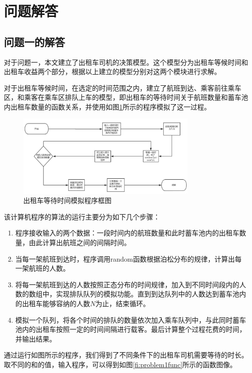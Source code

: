 \documentclass{cumcm}
\begin{document}
\section{问题解答}
\subsection{问题一的解答}
对于问题一，本文建立了出租车司机的决策模型。这个模型分为出租车等候时间和出租车收益两个部分，根据以上建立的模型分别对这两个模块进行求解。\par
对于出租车等候时间，在选定的时间范围之内，建立了航班到达、乘客前往乘车区，和乘客在乘车区排队上车的模型，即出租车的等待时间\waittime 关于航班数量\flightnum 和蓄车池内出租车数量\taxinum 的函数关系，并使用如图\ref{fi:program1}所示的程序模拟了这一过程。
\begin{figure}[H]
	\centering
	\includegraphics[width=0.8\textwidth]{img/program1.jpg}
	\caption{出租车等待时间模拟程序框图}
	\label{fi:program1}
\end{figure}
\par
该计算机程序的算法的运行主要分为如下几个步骤：
\begin{enumerate}[(1)]
	\item 程序接收输入的两个数据：一段时间内的航班数量\flightnum 和此时蓄车池内的出租车数量\taxinum ，由此计算出航班之间的间隔时间。
	\item 当每一架航班到达时，程序调用random函数根据泊松分布的规律，计算出每一架航班的人数。
	\item 将每一架航班到达的人数按照正态分布的时间规律，加入到不同时间段内的人数的数组中，实现排队队列的模拟功能。直到到达队列中的人数达到蓄车池内的出租车能够容纳的人数$N$为止，结束循环。
	\item 模拟一个队列，将各个时间的排队的数量依次加入乘车队列中，与此同时蓄车池内的出租车按照一定的时间间隔进行载客。最后计算整个过程花费的时间，并输出结果。
\end{enumerate}
通过运行如图所示的程序，我们得到了不同条件下的出租车司机需要等待的时长。取不同的\flightnum 和\taxinum 的值，输入程序，可以得到如图\ref{fi:problem1func}所示的函数图像。
\end{document}
